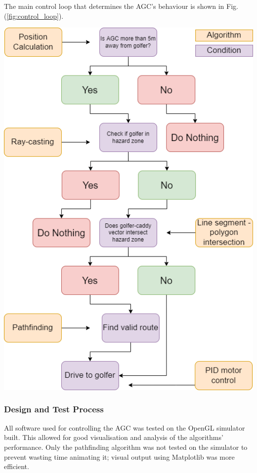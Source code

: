 \documentclass[11pt,landscape]{article}
\newenvironment{Figure}
  {\par\medskip\noindent\minipage{\linewidth}}
  {\endminipage\par\medskip}
\begin{document}
\begin{multicols}{3}
The main control loop that determines the AGC's behaviour is shown in Fig.
(\ref{fig:control_loop}).
\begin{Figure}
\begin{mdframed}
    \begin{center}
        \includegraphics[width=\textwidth]{control_loop.png}
    \end{center}
\end{mdframed}
\label{fig:control_loop}
\end{Figure}
\subsubsection{Design and Test Process}
All software used for controlling the AGC was tested on the OpenGL simulator
built. This allowed for good visualisation and analysis of the algorithms'
performance. Only the pathfinding algorithm was not tested on the simulator to
prevent wasting time animating it; visual output using Matplotlib was more
efficient.


\end{multicols}
\end{document}
